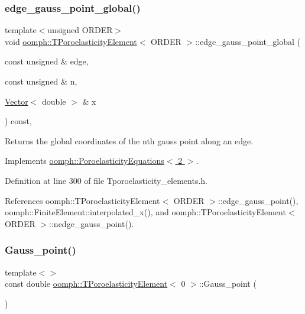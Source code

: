 \subsubsection{\texorpdfstring{edge\+\_\+gauss\+\_\+point\+\_\+global()}{edge\_gauss\_point\_global()}}
{\footnotesize\ttfamily template$<$unsigned O\+R\+D\+ER$>$ \\
void \hyperlink{classoomph_1_1TPoroelasticityElement}{oomph\+::\+T\+Poroelasticity\+Element}$<$ O\+R\+D\+ER $>$\+::edge\+\_\+gauss\+\_\+point\+\_\+global (\begin{DoxyParamCaption}\item[{const unsigned \&}]{edge,  }\item[{const unsigned \&}]{n,  }\item[{\hyperlink{classoomph_1_1Vector}{Vector}$<$ double $>$ \&}]{x }\end{DoxyParamCaption}) const\hspace{0.3cm}{\ttfamily [inline]}, {\ttfamily [virtual]}}



Returns the global coordinates of the nth gauss point along an edge. 



Implements \hyperlink{classoomph_1_1PoroelasticityEquations_a9809ca678dced8e69cb74dd7a75dffda}{oomph\+::\+Poroelasticity\+Equations$<$ 2 $>$}.



Definition at line 300 of file Tporoelasticity\+\_\+elements.\+h.



References oomph\+::\+T\+Poroelasticity\+Element$<$ O\+R\+D\+E\+R $>$\+::edge\+\_\+gauss\+\_\+point(), oomph\+::\+Finite\+Element\+::interpolated\+\_\+x(), and oomph\+::\+T\+Poroelasticity\+Element$<$ O\+R\+D\+E\+R $>$\+::nedge\+\_\+gauss\+\_\+point().

\mbox{\label{classoomph_1_1TPoroelasticityElement_aeab4df0b6061ae0f12ee8f43b46dd73c}} 
\subsubsection{\texorpdfstring{Gauss\+\_\+point()}{Gauss\_point()}\hspace{0.1cm}{\footnotesize\ttfamily [1/2]}}
{\footnotesize\ttfamily template$<$$>$ \\
const double \hyperlink{classoomph_1_1TPoroelasticityElement}{oomph\+::\+T\+Poroelasticity\+Element}$<$ 0 $>$\+::Gauss\+\_\+point (\begin{DoxyParamCaption}{ }\end{DoxyParamCaption})\hspace{0.3cm}{\ttfamily [private]}}



